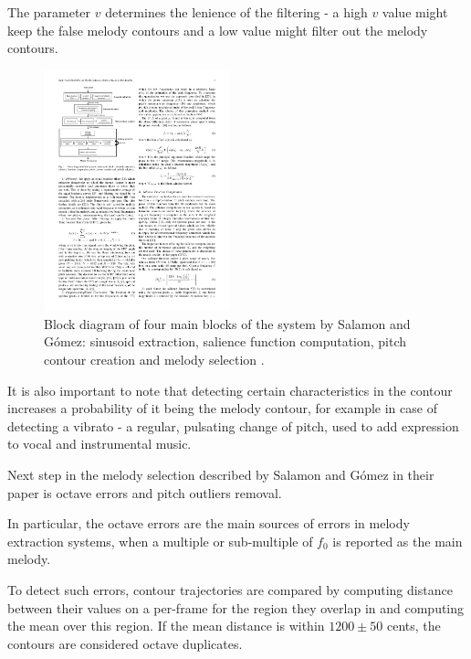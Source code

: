 The parameter $v$ determines the lenience of the filtering - a high $v$ value might keep the false melody contours and a low value might filter out the melody contours.

\begin{figure}
  \vspace{-30pt}

  \begin{center}
    \includegraphics[width=0.48\textwidth]{Figures/salamon4blocksdiagram}
  \end{center}
  \caption{Block diagram of four main blocks of the system by Salamon and G\'{o}mez: sinusoid extraction, salience function computation, pitch contour creation and melody selection \cite{salamon}.}
  \label{fig:salomondetailed}
\end{figure}



It is also important to note that detecting certain characteristics in the contour increases a probability of it being the melody contour, for example in case of detecting a vibrato -  a regular, pulsating change of pitch, used to add expression to vocal and instrumental music. \cite{vibrato}

Next step in the melody selection described by Salamon and G\'{o}mez in their paper is octave errors and pitch outliers removal.  

In particular, the octave errors are the main sources of errors in melody extraction systems, when a multiple or sub-multiple of $f_{0}$ is reported as the main melody. 

To detect such errors, contour trajectories are compared by computing distance between their values on a per-frame for the region they overlap in and computing the mean over this region.
If the mean distance is within $1200\pm50$ cents, the contours are considered octave duplicates.

